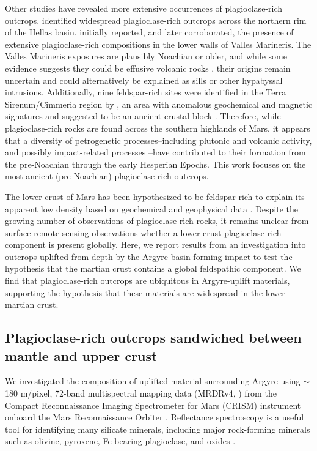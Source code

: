 \documentclass[11pt]{article}
\begin{document}
Other studies have revealed more extensive occurrences of plagioclase-rich outcrops. \citet{Phillips2022} identified widespread plagioclase-rich outcrops across the northern rim of the Hellas basin. \citet{Viviano-Beck2017} initially reported, and \citet{Flahaut2023} later corroborated, the presence of extensive plagioclase-rich compositions in the lower walls of Valles Marineris. The Valles Marineris exposures are plausibly Noachian or older, and while some evidence suggests they could be effusive volcanic rocks \citep{Flahaut2023}, their origins remain uncertain and could alternatively be explained as sills or other hypabyssal intrusions. Additionally, nine feldspar-rich sites were identified in the Terra Sirenum/Cimmeria region by \citet{Payre2022}, an area with anomalous geochemical and magnetic signatures and suggested to be an ancient crustal block \citep{Bouley2020}. Therefore, while plagioclase-rich rocks are found across the southern highlands of Mars, it appears that a diversity of petrogenetic processes--including plutonic and volcanic activity, and possibly impact-related processes \citep{Grieve1991, Hurwitz2014, Vaughan2014, Koeppel2020}--have contributed to their formation from the pre-Noachian through the early Hesperian Epochs. This work focuses on the most ancient (pre-Noachian) plagioclase-rich outcrops.

The lower crust of Mars has been hypothesized to be feldspar-rich to explain its apparent low density based on geochemical and geophysical data \citep{Baratoux2014, Goossens2017, Knapmeyer-Endrun2021}. Despite the growing number of observations of plagioclase-rich rocks, it remains unclear from surface remote-sensing observations whether a lower-crust plagioclase-rich component is present globally. Here, we report results from an investigation into outcrops uplifted from depth by the Argyre basin-forming impact to test the hypothesis that the martian crust contains a global feldspathic component. We find that plagioclase-rich outcrops are ubiquitous in Argyre-uplift materials, supporting the hypothesis that these materials are widespread in the lower martian crust.

\subsection*{Plagioclase-rich outcrops sandwiched between mantle and upper crust}

We investigated the composition of uplifted material surrounding Argyre using $\sim$180 m/pixel, 72-band multispectral mapping data (MRDRv4, \citealt{Seelos2023}) from the Compact Reconnaissance Imaging Spectrometer for Mars (CRISM) instrument onboard the Mars Reconnaissance Orbiter \citep{Murchie2007}. Reflectance spectroscopy is a useful tool for identifying many silicate minerals, including major rock-forming minerals such as olivine, pyroxene, Fe-bearing plagioclase, and oxides \citep{Adams1967, Adams1968, Clark1984}.
\end{document}

